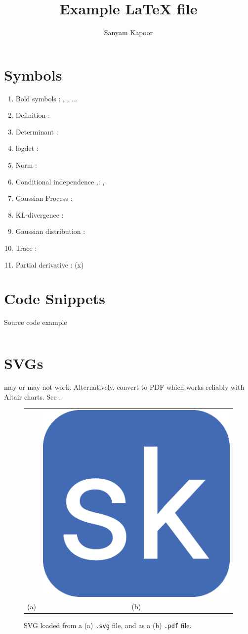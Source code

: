 \documentclass{article}
\title{Example \LaTeX{ }file}
\author{Sanyam Kapoor}
\begin{document}
\maketitle

\section{Symbols}

\begin{enumerate}%
\item Bold symbols \vrb{\mbf{}}: \mbf{\Sigma}, , $\dots$
\item Definition : 
\item Determinant \vrb{\determ{}}: \determ{\cdot}
\item logdet \vrb{\logdet{}}: \logdet{\cdot}
\item Norm \vrb{\norm{}}: \norm{\cdot}
\item Conditional independence \vrb{\ci},\vrb{\nci}: \ci, \nci
\item Gaussian Process \vrb{\gp}: \gp
\item KL-divergence \vrb{\kl}: \kl
\item Gaussian distribution \vrb{\gaussian{}}: \gaussian{\cdot, \cdot}
\item Trace \vrb{\tr{}}: \tr{\cdot}
\item Partial derivative \vrb{\pd{}{}}: (x)
\end{enumerate}

\section{Code Snippets}

\begin{code}
\caption{Source code example} \label{code:sample}
\inputminted[firstline=1,lastline=2,fontsize=\small]{python}{test.py}
\end{code}

\section{SVGs}

\vrb{} may or may not work. Alternatively, convert to PDF which works reliably with Altair charts. See .

\begin{figure}[ht]
    \centering
    \begin{tabular}{cc}
         & \includegraphics[width=0.15\linewidth]{favicon.pdf} \\
        (a) & (b)
    \end{tabular}
    \caption{SVG loaded from a (a) \texttt{.svg} file, and as a (b) \texttt{.pdf} file.}
    \label{fig:svg_pdf}
\end{figure}
\end{document}
